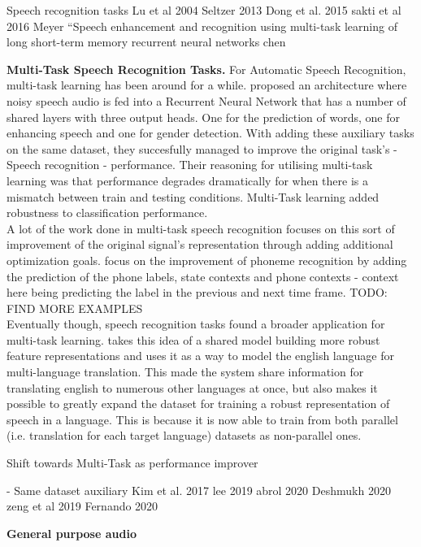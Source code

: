 Speech recognition tasks
Lu et al 2004
Seltzer 2013
Dong et al. 2015
sakti et al 2016
Meyer
“Speech enhancement and recognition using multi-task learning of long short-term memory recurrent neural networks chen

\textbf{Multi-Task Speech Recognition Tasks.} For Automatic Speech Recognition, multi-task learning has been around for a while. \cite{lu2004multitask} proposed an architecture where noisy speech audio is fed into a Recurrent Neural Network that has a number of shared layers with three output heads. One for the prediction of words, one for enhancing speech and one for gender detection. With adding these auxiliary tasks on the same dataset, they succesfully managed to improve the original task's - Speech recognition - performance. Their reasoning for utilising multi-task learning was that performance degrades dramatically for when there is a mismatch between train and testing conditions. Multi-Task learning added robustness to classification performance. \\

A lot of the work done in multi-task speech recognition focuses on this sort of improvement of the original signal's representation through adding additional optimization goals. \cite{seltzer2013multi} focus on the improvement of phoneme recognition by adding the prediction of the phone labels, state contexts and phone contexts - context here being predicting the label in the previous and next time frame. TODO: FIND MORE EXAMPLES\\

Eventually though, speech recognition tasks found a broader application for multi-task learning. \cite{dong2015multi} takes this idea of a shared model building more robust feature representations and uses it as a way to model the english language for multi-language translation. This made the system share information for translating english to numerous other languages at once, but also makes it possible to greatly expand the dataset for training a robust representation of speech in a language. This is because it is now able to train from both parallel (i.e. translation for each target language) datasets as non-parallel ones.



Shift towards Multi-Task as performance improver

- Same dataset auxiliary
Kim et al. 2017
lee 2019
abrol 2020
Deshmukh 2020
zeng et al 2019
Fernando 2020

\textbf{General purpose audio}

